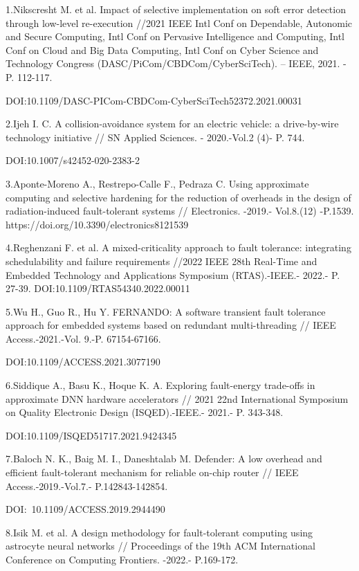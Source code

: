 \begin{noparindent}
1.Nikscresht M. et al. Impact of selective implementation on soft error
detection through low-level re-execution //2021 IEEE Intl Conf on
Dependable, Autonomic and Secure Computing, Intl Conf on Pervasive
Intelligence and Computing, Intl Conf on Cloud and Big Data Computing,
Intl Conf on Cyber Science and Technology Congress
(DASC/PiCom/CBDCom/CyberSciTech). -- IEEE, 2021. - P. 112-117.

DOI:10.1109/DASC-PICom-CBDCom-CyberSciTech52372.2021.00031

2.Ijeh I. C. A collision-avoidance system for an electric vehicle: a
drive-by-wire technology initiative // SN Applied Sciences. -
2020.-Vol.2 (4)- P. 744.

DOI:10.1007/s42452-020-2383-2

3.Aponte-Moreno A., Restrepo-Calle F., Pedraza C. Using approximate
computing and selective hardening for the reduction of overheads in the
design of radiation-induced fault-tolerant systems // Electronics.
-2019.- Vol.8.(12) -P.1539. https://doi.org/10.3390/electronics8121539

4.Reghenzani F. et al. A mixed-criticality approach to fault tolerance:
integrating schedulability and failure requirements //2022 IEEE 28th
Real-Time and Embedded Technology and Applications Symposium
(RTAS).-IEEE.- 2022.- P. 27-39. DOI:10.1109/RTAS54340.2022.00011

5.Wu H., Guo R., Hu Y. FERNANDO: A software transient fault tolerance
approach for embedded systems based on redundant multi-threading // IEEE
Access.-2021.-Vol. 9.-P. 67154-67166.

DOI:10.1109/ACCESS.2021.3077190

6.Siddique A., Basu K., Hoque K. A. Exploring fault-energy trade-offs in
approximate DNN hardware accelerators // 2021 22nd International
Symposium on Quality Electronic Design (ISQED).-IEEE.- 2021.- P.
343-348.

DOI:10.1109/ISQED51717.2021.9424345

7.Baloch N. K., Baig M. I., Daneshtalab M. Defender: A low overhead and
efficient fault-tolerant mechanism for reliable on-chip router // IEEE
Access.-2019.-Vol.7.- P.142843-142854.

DOI:~10.1109/ACCESS.2019.2944490

8.Isik M. et al. A design methodology for fault-tolerant computing using
astrocyte neural networks // Proceedings of the 19th ACM International
Conference on Computing Frontiers. -2022.- P.169-172.


\end{noparindent}
